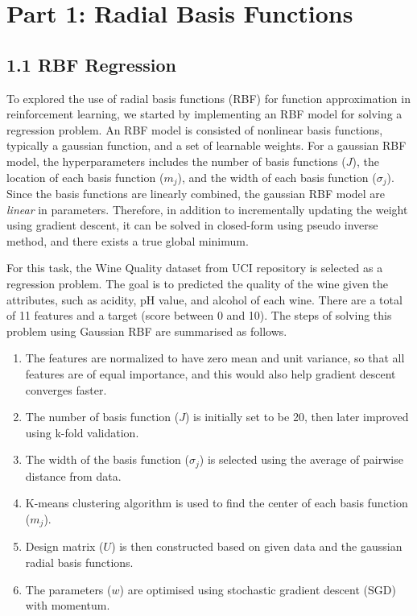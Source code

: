 \documentclass[12pt,letterpaper]{article}
\newenvironment{myitemize}
{ \begin{enumerate}
    \setlength{\itemsep}{1pt}
    \setlength{\parskip}{1pt}
    \setlength{\parsep}{1pt}     }
{ \end{enumerate}         }
\begin{document}
\section*{Part 1: Radial Basis Functions}

\subsection*{1.1 RBF Regression}
To explored the use of radial basis functions (RBF) for function approximation in reinforcement learning,
we started by implementing an RBF model for solving a regression problem. 
An RBF model is consisted of nonlinear basis functions, typically a gaussian function, and a set of learnable weights. 
For a gaussian RBF model, the hyperparameters includes the number of basis functions ($J$), the location of each basis function ($m_j$), 
and the width of each basis function ($\sigma_j$). 
Since the basis functions are linearly combined, the gaussian RBF model are \textit{linear} in parameters. 
Therefore, in addition to incrementally updating the weight using gradient descent, 
it can be solved in closed-form using pseudo inverse method, and there exists a true global minimum.

For this task, the Wine Quality dataset from UCI repository is selected as a regression problem. 
The goal is to predicted the quality of the wine given the attributes, such as acidity, pH value, and alcohol of each wine. 
There are a total of 11 features and a target (score between 0 and 10). 
The steps of solving this problem using Gaussian RBF are summarised as follows.
\begin{myitemize}
    \item The features are normalized to have zero mean and unit variance, 
    so that all features are of equal importance, and this would also help gradient descent converges faster.
    \item The number of basis function ($J$) is initially set to be 20, then later improved using k-fold validation.
    \item The width of the basis function ($\sigma_j$) is selected using the average of pairwise distance from data.
    \item K-means clustering algorithm is used to find the center of each basis function ($m_j$).
    \item Design matrix ($U$) is then constructed based on given data and the gaussian radial basis functions.
    \item The parameters ($w$) are optimised using stochastic gradient descent (SGD) with momentum.
\end{myitemize}    
\end{document}
